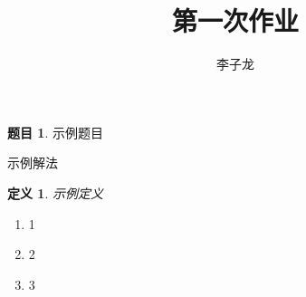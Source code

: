 \documentclass[UTF8,12pt,a4paper]{ctexart}
\author{李子龙}
\makeatletter
\theoremstyle{definition}\newtheorem{problem}{题目}
\theoremstyle{plain}\newtheorem*{solution}{Solution}
\newtheorem{definition}{定义}
\renewenvironment{solution}[1][解] {\par\pushQED{\qed}\normalfont\topsep6\p@\@plus6\p@\relax\trivlist\item[\hskip\labelsep\bfseries#1\@addpunct{.}]\ignorespaces}{\popQED\endtrivlist\@endpefalse}
\makeatother
\begin{document}
    \title{第一次作业}
    \maketitle
    \begin{problem}
        示例题目
    \end{problem}
    \begin{solution}
        示例解法
        \begin{definition}
            示例定义
        \end{definition}
        \begin{enumerate}
            \item 1
            \item 2
            \item 3
        \end{enumerate}
    \end{solution}
\end{document}
